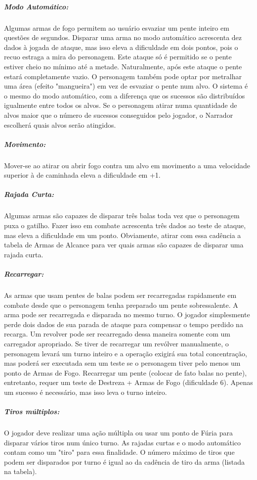 \subparagraph{\bf Modo Automático:}
Algumas armas de fogo permitem ao usuário esvaziar um pente inteiro em questões de segundos. Disparar uma arma no modo automático acrescenta dez dados à jogada de ataque, mas isso eleva a dificuldade em dois pontos, pois o recuo estraga a mira do personagem. Este ataque só é permitido se o pente estiver cheio no mínimo até a metade. Naturalmente, após este ataque o pente estará completamente vazio. 
O personagem também pode optar por metralhar uma área (efeito "mangueira") em vez de esvaziar o pente num alvo. O sistema é o mesmo do modo automático, com a diferença que os sucessos são distribuídos igualmente entre todos os alvos. Se o personagem atirar numa quantidade de alvos maior que o número de sucessos conseguidos pelo jogador, o Narrador escolherá quais alvos serão atingidos.

\subparagraph{\bf Movimento:}
Mover-se ao atirar ou abrir fogo contra um alvo em movimento a uma velocidade superior à de caminhada eleva a dificuldade em +1.

\subparagraph{\bf Rajada Curta:}
Algumas armas são capazes de disparar três balas toda vez que o personagem puxa o gatilho. Fazer isso em combate acrescenta três dados ao teste de ataque, mas eleva a dificuldade em um ponto. Obviamente, atirar com essa cadência a tabela de Armas de Alcance para ver quais armas são capazes de disparar uma rajada curta.

\subparagraph{\bf Recarregar:}
As armas que usam pentes de balas podem ser recarregadas rapidamente em combate desde que o personagem tenha preparado um pente sobressalente. A arma pode ser recarregada e disparada no mesmo turno. O jogador simplesmente perde dois dados de sua parada de ataque para compensar o tempo perdido na recarga.
Um revolver pode ser recarregado dessa maneira somente com um carregador apropriado. Se tiver de recarregar um revólver manualmente, o personagem levará um turno inteiro e a operação exigirá sua total concentração, mas poderá ser executada sem um teste se o personagem tiver pelo menos um ponto de Armas de Fogo. Recarregar um pente (colocar de fato balas no pente), entretanto, requer um teste de Destreza + Armas de Fogo (dificuldade 6). Apenas um sucesso é necessário, mas isso leva o turno inteiro.

\subparagraph{\bf Tiros múltiplos:}
O jogador deve realizar uma ação múltipla ou usar um ponto de Fúria para disparar vários tiros num único turno. As rajadas curtas e o modo automático contam como um "tiro" para essa finalidade. O número máximo de tiros que podem ser disparados por turno é igual ao da cadência de tiro da arma (listada na tabela).
